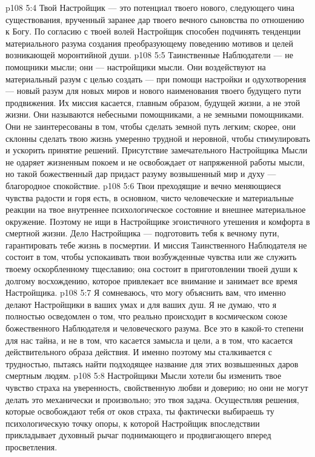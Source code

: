 \vs p108 5:4 \pc Твой Настройщик --- это потенциал твоего нового, следующего чина существования, врученный заранее дар твоего вечного сыновства по отношению к Богу. По согласию с твоей волей Настройщик способен подчинять тенденции материального разума создания преобразующему поведению мотивов и целей возникающей моронтийной души.
\vs p108 5:5 Таинственные Наблюдатели --- не помощники мысли; они --- настройщики мысли. Они воздействуют на материальный разум с целью создать --- при помощи настройки и одухотворения --- новый разум для новых миров и нового наименования твоего будущего пути продвижения. Их миссия касается, главным образом, будущей жизни, а не этой жизни. Они называются небесными помощниками, а не земными помощниками. Они не заинтересованы в том, чтобы сделать земной путь легким; скорее, они склонны сделать твою жизнь умеренно трудной и неровной, чтобы стимулировать и ускорить принятие решений. Присутствие замечательного Настройщика Мысли не одаряет жизненным покоем и не освобождает от напряженной работы мысли, но такой божественный дар придаст разуму возвышенный мир и духу --- благородное спокойствие.
\vs p108 5:6 Твои преходящие и вечно меняющиеся чувства радости и горя есть, в основном, чисто человеческие и материальные реакции на твое внутреннее психологическое состояние и внешнее материальное окружение. Поэтому не ищи в Настройщике эгоистичного утешения и комфорта в смертной жизни. Дело Настройщика --- подготовить тебя к вечному пути, гарантировать тебе жизнь в посмертии. И миссия Таинственного Наблюдателя не состоит в том, чтобы успокаивать твои возбужденные чувства или же служить твоему оскорбленному тщеславию; она состоит в приготовлении твоей души к долгому восхождению, которое привлекает все внимание и занимает все время Настройщика.
\vs p108 5:7 Я сомневаюсь, что могу объяснить вам, что именно делают Настройщики в ваших умах и для ваших душ. Я не думаю, что я полностью осведомлен о том, что реально происходит в космическом союзе божественного Наблюдателя и человеческого разума. Все это в какой\hyp{}то степени для нас тайна, и не в том, что касается замысла и цели, а в том, что касается действительного образа действия. И именно поэтому мы сталкивается с трудностью, пытаясь найти подходящее название для этих возвышенных даров смертным людям.
\vs p108 5:8 Настройщики Мысли хотели бы изменить твое чувство страха на уверенность, свойственную любви и доверию; но они не могут делать это механически и произвольно; это твоя задача. Осуществляя решения, которые освобождают тебя от оков страха, ты фактически выбираешь ту психологическую точку опоры, к которой Настройщик впоследствии прикладывает духовный рычаг поднимающего и продвигающего вперед просветления.
